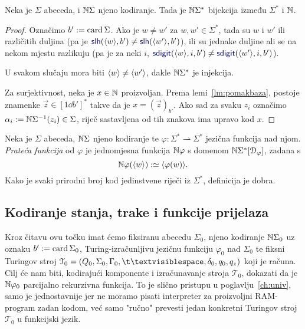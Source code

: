 \begin{propozicija}[{name=[bijektivnost kodiranja riječi]}]\label{pp:bijkr}
Neka je $\Sigma$ abeceda, i ${\mathbb N}\Sigma$ njeno kodiranje. Tada je ${\mathbb N}\Sigma^*$ bijekcija između $\Sigma^*$ i ${\mathbb N}$.
\end{propozicija}
\begin{proof}
Označimo $b':=\operatorname{card}\Sigma$. Ako je $w\ne w'$ za $w,w'\in\Sigma^*$, tada su $w$ i $w'$ ili različitih duljina (pa je $\f{slh}(\kr w,b')\ne\f{slh}(\kr{w'},b')$), ili su jednake duljine ali se na nekom mjestu razlikuju (pa je za neki $i$, $\f{sdigit}(\kr w,i,b')\ne\f{sdigit}(\kr{w'},i,b')$).

U svakom slučaju mora biti $\langle w\rangle\ne\langle w'\rangle$, dakle ${\mathbb N}\Sigma^*$ je injekcija.

Za surjektivnost, neka je $x\in{\mathbb N}$ proizvoljan. Prema lemi~\ref{lm:pomakbaza}, postoje znamenke $\vec z\in[1\dd b']^*$ takve da je $x=(\vec z)_{b'}$. Ako sad za svaku $z_i$ označimo $\alpha_i:={\mathbb N}\Sigma^{-1}(z_i)\in\Sigma$, riječ sastavljena od tih znakova ima upravo kod $x$.
\end{proof}


\begin{definicija}[{name=[prateća funkcija jezične funkcije]}]\label{def:kodfi}
Neka je $\Sigma$ abeceda, ${\mathbb N}\Sigma$ njeno kodiranje te $\varphi:\Sigma^*\rightharpoonup\Sigma^*$ jezična funkcija nad njom. \emph{Prateća funkcija} od $\varphi$ je jednomjesna funkcija ${\mathbb N}\varphi$ s domenom ${\mathbb N}\Sigma^*[\mathcal D_{\varphi}]$, zadana s
\begin{equation}\label{eq:kodfidef}
    {\mathbb N}\varphi(\langle w\rangle):\simeq\langle\varphi(w)\rangle\text.
\end{equation}
Kako je svaki prirodni broj kod jedinstvene riječi iz $\Sigma^*$, definicija je dobra.
\end{definicija}

\subsection{Kodiranje stanja, trake i funkcije prijelaza}

Kroz čitavu ovu točku imat ćemo fiksiranu abecedu $\Sigma_0$, njeno kodiranje ${\mathbb N}\Sigma_0$ uz oznaku $b':=\operatorname{card}\Sigma_0$, Turing-izračunljivu jezičnu funkciju $\varphi_0$ nad $\Sigma_0$ te fiksni Turingov stroj $\mathcal T_0=(Q_0,\Sigma_0,\Gamma_0,\bl,\delta_0,q_0,q_z)$ koji je računa. Cilj će nam biti, kodirajući komponente i izračunavanje stroja $\mathcal T_0$, dokazati da je ${\mathbb N}\varphi_0$ parcijalno rekurzivna funkcija. To je slično pristupu u poglavlju~\ref{ch:univ}, samo je jednostavnije jer ne moramo pisati interpreter za proizvoljni RAM-program zadan kodom, već samo "ručno" prevesti jedan konkretni Turingov stroj $\mathcal T_0$ u funkcijski jezik.

